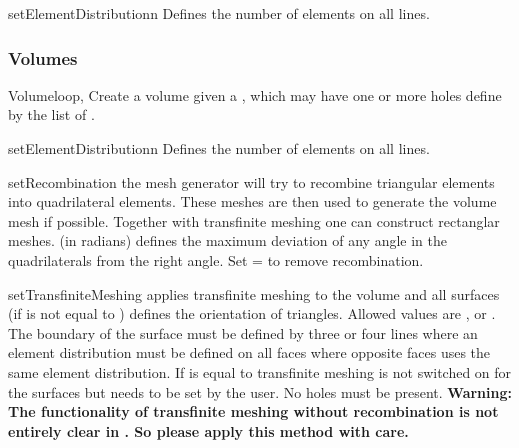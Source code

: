 \begin{methoddesc}[RuledSurface]{setElementDistribution}{n}
Defines the number of elements on all lines.
\end{methoddesc}

\subsubsection{Volumes}

\begin{classdesc}{Volume}{loop, }
Create a volume given a , which may have one or more holes
define by the list of .
\end{classdesc}

\begin{methoddesc}[Volume]{setElementDistribution}{n}
Defines the number of elements on all lines.
\end{methoddesc}

\begin{methoddesc}[Volume]{setRecombination}{}
the mesh generator will try to recombine triangular elements
into quadrilateral elements. These meshes are then used to generate the volume mesh if possible.
Together with transfinite meshing one can construct rectanglar meshes.
 (in radians) defines the maximum deviation of any angle in the quadrilaterals from the right angle.
Set = to remove recombination.
\end{methoddesc}

\begin{methoddesc}[Volume]{setTransfiniteMeshing}{}
applies transfinite meshing to the volume and all surfaces (if  is not equal to )
 defines the orientation of triangles. Allowed values
are ,  or . The
boundary of the surface must be defined by three or four lines where an
element distribution must be defined on all faces where opposite
faces uses the same element distribution.
If  is equal to  transfinite meshing is not switched on for the surfaces but needs
to be set by the user. No holes must be present.
\textbf{Warning: The functionality of transfinite meshing without recombination is not entirely clear in \gmshextern.
So please apply this method with care.}
\end{methoddesc}


